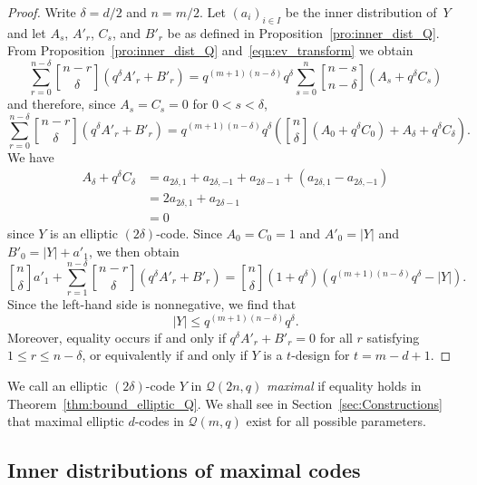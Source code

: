 \documentclass[10pt]{article}
\theoremstyle{definition}
\newcommand{\Q}{\mathscr{Q}}
\renewcommand{\d}{\delta}
\newcommand{\abs}[1]{\lvert#1\rvert}
\begin{document}
\begin{proof}
Write $\delta=d/2$ and $n=m/2$. Let $(a_i)_{i\in I}$ be the inner distribution of~$Y$ and let $A_s$, $A'_r$, $C_s$, and $B'_r$ be as defined in Proposition~\ref{pro:inner_dist_Q}. From Proposition~\ref{pro:inner_dist_Q} and~\eqref{eqn:ev_transform} we obtain
\[
\sum_{r=0}^{n-\delta}\genfrac{[}{]}{0pt}{}{n-r}{\delta}(q^\delta A'_r+B'_r)=q^{(m+1)(n-\delta)}q^\delta\sum_{s=0}^n\genfrac{[}{]}{0pt}{}{n-s}{n-\delta}(A_s+q^\delta C_s)
\]
and therefore, since $A_s=C_s=0$ for $0<s<\delta$,
\[
\sum_{r=0}^{n-\delta}\genfrac{[}{]}{0pt}{}{n-r}{\delta}(q^\delta A'_r+B'_r)=q^{(m+1)(n-\delta)}q^\delta\left(\genfrac{[}{]}{0pt}{}{n}{\delta}(A_0+q^\delta C_0)+A_\delta+q^\delta C_\delta\right).
\]
We have
\begin{align*}
A_\delta+q^\delta C_\delta&=a_{2\delta,1}+a_{2\delta,-1}+a_{2\delta-1}+(a_{2\delta,1}-a_{2\delta,-1})\\
&=2a_{2\delta,1}+a_{2\delta-1}\\
&=0
\end{align*}
since $Y$ is an elliptic $(2\delta)$-code. Since $A_0=C_0=1$ and $A'_0=\abs{Y}$ and $B'_0=\abs{Y}+a'_1$, we then obtain
\[
\genfrac{[}{]}{0pt}{}{n}{\delta}a'_1+\sum_{r=1}^{n-\delta}\genfrac{[}{]}{0pt}{}{n-r}{\delta}(q^\delta A'_r+B'_r)=\genfrac{[}{]}{0pt}{}{n}{\delta}(1+q^\delta)(q^{(m+1)(n-\delta)}q^\delta-\abs{Y}).
\]
Since the left-hand side is nonnegative, we find that
\[
\abs{Y}\le q^{(m+1)(n-\delta)}q^\delta.%
\]
Moreover, equality occurs if and only if $q^\delta A'_r+B'_r=0$ for all $r$ satisfying $1\le r\le n-\delta$, or equivalently if and only if $Y$ is a $t$-design for $t=m-d+1$.
\end{proof}
We call an elliptic $(2\d)$-code $Y$ in $\Q(2n,q)$ \emph{maximal} if equality holds in Theorem~\ref{thm:bound_elliptic_Q}. We shall see in Section~\ref{sec:Constructions} that maximal elliptic $d$-codes in $\Q(m,q)$ exist for all possible parameters. 

%

\subsection{Inner distributions of maximal codes}
\end{document}
